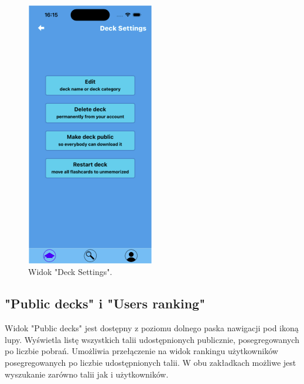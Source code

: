 \begin{figure}[H]
    \centering
    \includegraphics[width=0.5\textwidth]{chapters/chapter_10/images_mobile/mobile_deck_settings}
    \caption{Widok "Deck Settings".}
    \label{img:mobile_deck_settings}
\end{figure}


\subsection{"Public decks" i "Users ranking"}
Widok "Public decks" jest dostępny z poziomu dolnego paska nawigacji pod ikoną lupy. Wyświetla listę wszystkich talii udostępnionych publicznie, posegregowanych po liczbie pobrań. Umożliwia przełączenie na widok rankingu użytkowników posegregowanych po liczbie udostępnionych talii. W obu zakładkach możliwe jest wyszukanie zarówno talii jak i użytkowników.


